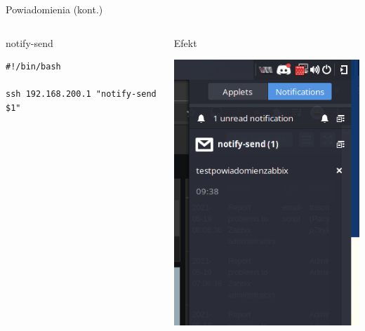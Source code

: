\documentclass[presentation]{beamer}
\begin{document}
\begin{frame}[label={sec:orgc3e5286},fragile]{Powiadomienia (kont.)}
 \begin{columns}
\begin{column}{0.6\columnwidth}
\begin{block}{notify-send}
\begin{verbatim}
#!/bin/bash

ssh 192.168.200.1 "notify-send $1"
\end{verbatim}
\end{block}
\end{column}

\begin{column}{0.4\columnwidth}
\begin{block}{Efekt}
\begin{center}
\includegraphics[width=.9\linewidth]{./data/zabbix/notify-send.png}
\end{center}
\end{block}
\end{column}
\end{columns}
\end{frame}
\end{document}
